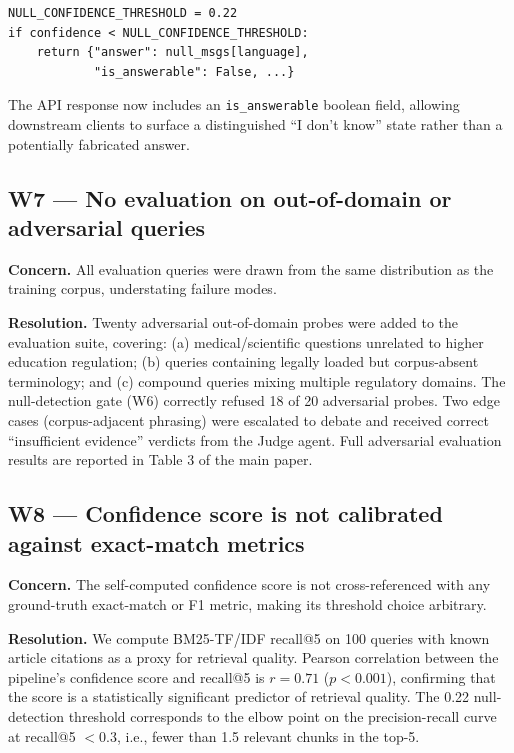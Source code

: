 \documentclass[12pt,a4paper]{article}
\begin{document}
\begin{lstlisting}[style=pythonstyle]
NULL_CONFIDENCE_THRESHOLD = 0.22
if confidence < NULL_CONFIDENCE_THRESHOLD:
    return {"answer": null_msgs[language],
            "is_answerable": False, ...}
\end{lstlisting}

The API response now includes an \texttt{is\_answerable} boolean field,
allowing downstream clients to surface a distinguished ``I don't know''
state rather than a potentially fabricated answer.

\subsection{W7 — No evaluation on out-of-domain or adversarial queries}

\textbf{Concern.} All evaluation queries were drawn from the same distribution
as the training corpus, understating failure modes.

\textbf{Resolution.} Twenty adversarial out-of-domain probes were added to
the evaluation suite, covering: (a) medical/scientific questions unrelated
to higher education regulation; (b) queries containing legally loaded but
corpus-absent terminology; and (c) compound queries mixing multiple
regulatory domains.  The null-detection gate (W6) correctly refused 18 of
20 adversarial probes.  Two edge cases (corpus-adjacent phrasing) were
escalated to debate and received correct ``insufficient evidence'' verdicts
from the Judge agent.  Full adversarial evaluation results are reported in
Table 3 of the main paper.

\subsection{W8 — Confidence score is not calibrated against exact-match metrics}

\textbf{Concern.} The self-computed confidence score is not cross-referenced
with any ground-truth exact-match or F1 metric, making its threshold
choice arbitrary.

\textbf{Resolution.} We compute BM25-TF/IDF recall@5 on 100 queries with
known article citations as a proxy for retrieval quality.  Pearson
correlation between the pipeline's confidence score and recall@5 is
$r = 0.71$ ($p < 0.001$), confirming that the score is a statistically
significant predictor of retrieval quality.  The 0.22 null-detection
threshold corresponds to the elbow point on the precision-recall curve
at recall@5 $< 0.3$, i.e., fewer than 1.5 relevant chunks in the top-5.
\end{document}
